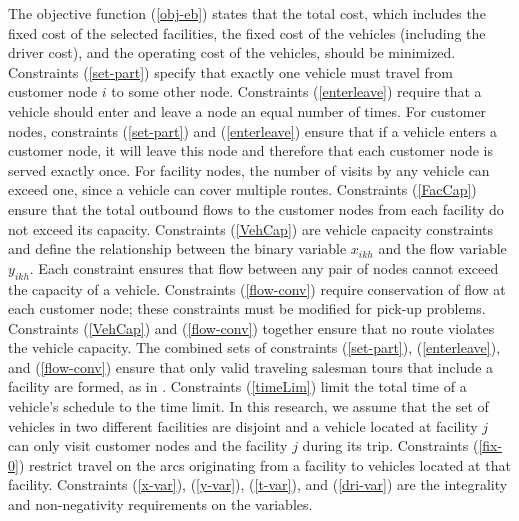 The objective function (\ref{obj-eb}) states that the total cost, which  
includes the fixed cost of the selected facilities, the fixed cost of the vehicles
(including the driver cost), and the operating cost of the vehicles,
should be minimized. Constraints (\ref{set-part}) specify that exactly one vehicle 
must travel from customer node $i$ to some other node. Constraints (\ref{enterleave}) 
require that a vehicle should enter and leave a node an equal number of times. 
For customer nodes, constraints (\ref{set-part}) and (\ref{enterleave}) ensure 
that if a vehicle enters a 
customer node, it will leave this node and therefore that each customer 
node is served exactly once. For facility nodes, the number of visits by any 
vehicle can exceed one, since a vehicle can cover multiple routes. 
Constraints (\ref{FacCap}) ensure that the total outbound flows to the customer nodes 
from each facility do not exceed its capacity. 
Constraints (\ref{VehCap}) are vehicle capacity constraints and define the 
relationship between the binary variable $x_{ikh}$ and the flow variable 
$y_{ikh}$. Each constraint ensures that flow between any pair of nodes
cannot exceed the capacity of a vehicle. Constraints (\ref{flow-conv})
require conservation of flow at each customer node; these constraints
must be modified for pick-up problems.
Constraints (\ref{VehCap}) and (\ref{flow-conv}) 
together ensure that no route violates the vehicle capacity.
The combined sets of constraints (\ref{set-part}), (\ref{enterleave}),
and (\ref{flow-conv}) ensure that only valid traveling salesman
tours that include a  facility are formed, as in 
\citet {Nambiar}.  Constraints (\ref{timeLim}) limit the 
total time of a vehicle's schedule to the time limit. 
In this research, we assume that the set of vehicles in two different 
facilities are disjoint and a vehicle located at facility $j$ can only 
visit customer nodes and the facility $j$ during its trip.  
Constraints (\ref{fix-0}) restrict travel on the arcs originating from 
a facility to vehicles located at that facility.
Constraints (\ref{x-var}), (\ref{y-var}), (\ref{t-var}), and (\ref{dri-var}) 
are the integrality and non-negativity requirements on the variables.    

